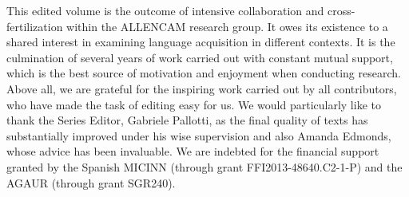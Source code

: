 This edited volume is the outcome of intensive collaboration and cross-ferti\-li\-za\-tion within the ALLENCAM research group. It owes its existence to a shared interest in examining language acquisition in different contexts. It is the culmination of several years of work carried out with constant mutual support, which is the best source of motivation and enjoyment when conducting research. Above all, we are grateful for the inspiring work carried out by all contributors, who have made the task of editing easy for us.
We would particularly like to thank the Series Editor, Gabriele Pallotti, as the final quality of texts has substantially improved under his wise supervision and also Amanda Edmonds, whose advice has been invaluable. We are indebted for the financial support granted by the Spanish MICINN (through grant FFI2013-48640.C2-1-P) and the AGAUR (through grant SGR240).  

  

